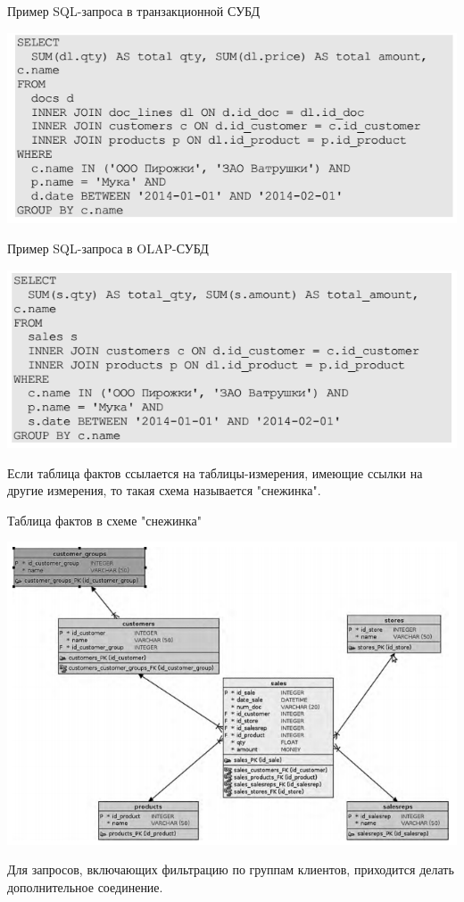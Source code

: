 \documentclass{beamer}
\begin{document}
\begin{frame}
\begin{block}{Пример SQL-запроса в транзакционной СУБД}
\begin{center}
\includegraphics[scale=0.45]{images/sql-trans.png}
\end{center}
\end{block}
\begin{block}{Пример SQL-запроса в OLAP-СУБД}
\begin{center}
\includegraphics[scale=0.45]{images/sql-analitic.png}
\end{center}
\end{block}
\end{frame}

\begin{frame}
Если таблица фактов ссылается на таблицы-измерения, имеющие ссылки на другие измерения, то такая схема называется "снежинка".
\begin{block}{Таблица фактов в схеме "снежинка"}
\begin{center}
\includegraphics[scale=0.45]{images/snow.png}
\end{center}
\end{block}
Для запросов, включающих фильтрацию по группам клиентов, приходится делать дополнительное соединение.
\end{frame}
\end{document}

